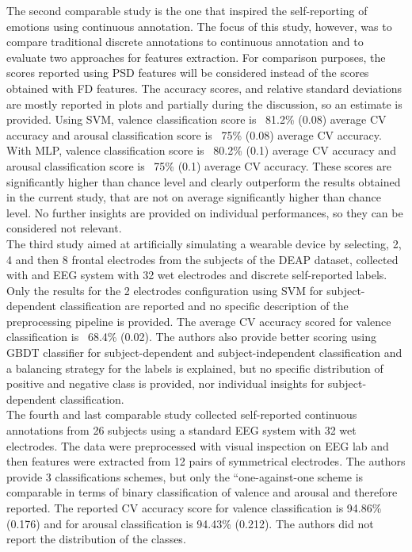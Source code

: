 The second comparable study \cite{thammasan_continuous_2016} is the one that inspired the self-reporting of emotions using continuous annotation. The focus of this study, however, was to compare traditional discrete annotations to continuous annotation and to evaluate two approaches for features extraction. For comparison purposes, the scores reported using PSD features will be considered instead of the scores obtained with FD features. The accuracy scores, and relative standard deviations are mostly reported in plots and partially during the discussion, so an estimate is provided. Using SVM, valence classification score is ~81.2\% (0.08) average CV accuracy and arousal classification score is ~75\% (0.08) average CV accuracy. With MLP, valence classification score is ~80.2\% (0.1) average CV accuracy and arousal classification score is ~75\% (0.1) average CV accuracy. These scores are significantly higher than chance level and clearly outperform the results obtained in the current study, that are not on average significantly higher than chance level. No further insights are provided on individual performances, so they can be considered not relevant. 
\\
The third study \cite{wu_estimation_2017} aimed at artificially simulating a wearable device by selecting, 2, 4 and then 8 frontal electrodes from the subjects of the DEAP dataset, collected with and EEG system with 32 wet electrodes and discrete self-reported labels. Only the results for the 2 electrodes configuration using SVM for subject-dependent classification are reported and no specific description of the preprocessing pipeline is provided. The average CV accuracy scored for valence classification is ~68.4\% (0.02). The authors also provide better scoring using GBDT classifier for subject-dependent and subject-independent classification and a balancing strategy for the labels is explained, but no specific distribution of positive and negative class is provided, nor individual insights for subject-dependent classification.
\\
The fourth and last comparable study \cite{lin_eeg-based_2009} collected self-reported continuous annotations from 26 subjects using a standard EEG system with 32 wet electrodes. The data were preprocessed with visual inspection on EEG lab and then features were extracted from 12 pairs of symmetrical electrodes. The authors provide 3 classifications schemes, but only the “one-against-one scheme is comparable in terms of binary classification of valence and arousal and therefore reported. The reported CV accuracy score for valence classification is 94.86\% (0.176) and for arousal classification is 94.43\% (0.212). The authors did not report the distribution of the classes.
